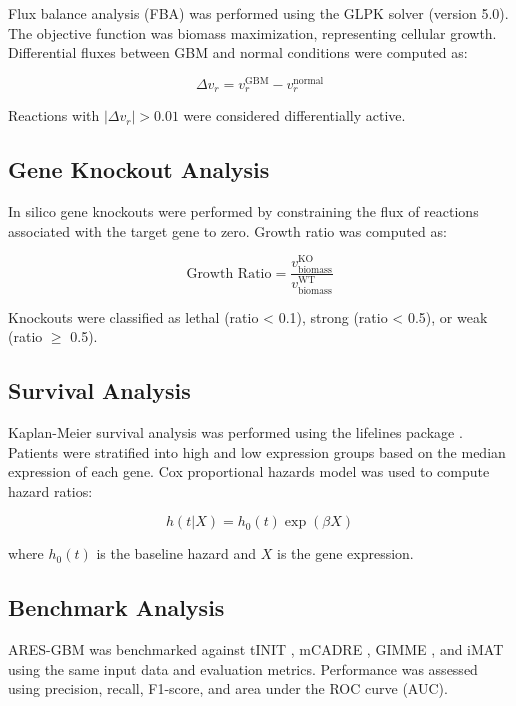 \documentclass[12pt, a4paper]{article}
\begin{document}
Flux balance analysis (FBA) was performed using the GLPK solver (version 5.0). The objective function was biomass maximization, representing cellular growth. Differential fluxes between GBM and normal conditions were computed as:

\begin{equation}
\Delta v_r = v_r^{\text{GBM}} - v_r^{\text{normal}}
\end{equation}

Reactions with $|\Delta v_r| > 0.01$ were considered differentially active.

\subsection{Gene Knockout Analysis}

In silico gene knockouts were performed by constraining the flux of reactions associated with the target gene to zero. Growth ratio was computed as:

\begin{equation}
\text{Growth Ratio} = \frac{v_{\text{biomass}}^{\text{KO}}}{v_{\text{biomass}}^{\text{WT}}}
\end{equation}

Knockouts were classified as lethal (ratio < 0.1), strong (ratio < 0.5), or weak (ratio $\geq$ 0.5).

\subsection{Survival Analysis}

Kaplan-Meier survival analysis was performed using the lifelines package \citep{lifelines2020}. Patients were stratified into high and low expression groups based on the median expression of each gene. Cox proportional hazards model was used to compute hazard ratios:

\begin{equation}
h(t|X) = h_0(t) \exp(\beta X)
\end{equation}

where $h_0(t)$ is the baseline hazard and $X$ is the gene expression.

\subsection{Benchmark Analysis}

ARES-GBM was benchmarked against tINIT \citep{agren2014reconstruction}, mCADRE \citep{wang2012systematic}, GIMME \citep{becker2007reconstruction}, and iMAT \citep{zur2010mass} using the same input data and evaluation metrics. Performance was assessed using precision, recall, F1-score, and area under the ROC curve (AUC).
\end{document}
